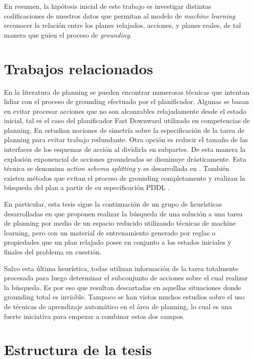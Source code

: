 En resumen, la hipótesis inicial de este trabajo es investigar distintas
codificaciones de nuestros datos que permitan al modelo de \emph{machine
learning} reconocer la relación entre los planes relajados, acciones, y planes
reales, de tal manera que guíen el proceso de \emph{grounding}.

\section{Trabajos relacionados}

En la literatura de planning se pueden encontrar numerosas técnicas que intentan
lidiar con el proceso de grounding efectuado por el planificador. Algunas se
basan en evitar procesar acciones que no son alcanzables relajadamente desde el
estado inicial, tal es el caso del planificador Fast Downward
\citep{Helmert-2011} utilizado en competencias de planning. En
\citep{Röger_Sievers_Katz_2018} estudian nociones de simetría sobre la
especificación de la tarea de planning para evitar trabajo redundante. Otra
opción es reducir el tamaño de las interfaces de los esquemas de acción al
dividirla en subpartes. De esta manera la explosión exponencial de acciones
groundeadas se disminuye drásticamente. Esta técnica se denomina \emph{action
schema splitting} y es desarrollada en
\citep{Areces_Bustos_Dominguez_Hoffmann_2014}. También existen métodos que
evitan el proceso de grounding completamente y realizan la búsqueda del plan a
partir de su especificación PDDL \citep{Penberthy-1992}.

En particular, esta tesis sigue la continuación de un grupo de heurísticas
desarrolladas en \citep{Gnad_Torralba_Dominguez_Areces_Bustos_2019} que proponen
realizar la búsqueda de una solución a una tarea de planning por medio de un
espacio reducido utilizando técnicas de machine learning, pero con un material de
entrenamiento generado por reglas o propiedades que un plan relajado posee en
conjunto a los estados iniciales y finales del problema en cuestión.

Salvo esta última heurística, todas utilizan información de la tarea totalmente
procesada para luego determinar el subconjunto de acciones sobre el cual
realizar la búsqueda. Es por eso que resultan descartadas en aquellas
situaciones donde grounding total es inviable. Tampoco se han vistos muchos
estudios sobre el uso de técnicas de aprendizaje automático en el área de
planning, lo cual es una fuerte iniciativa para empezar a combinar estos dos
campos.

\section{Estructura de la tesis}

